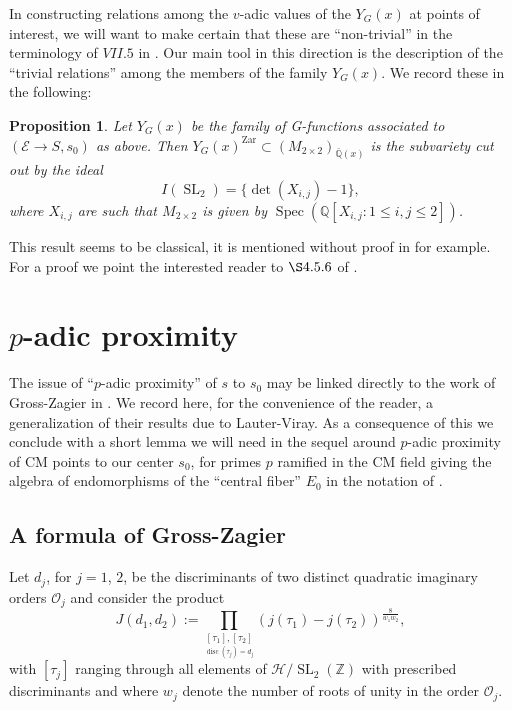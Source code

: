 \documentclass[12pt,twoside,a4paper]{article}
\theoremstyle{plain}%
\newtheorem{prop}[theorem]{Proposition}
\DeclareMathOperator{\SL}{SL}
\DeclareMathOperator{\spec}{Spec}
\DeclareMathOperator{\disc}{disc}
\DeclareMathOperator{\zar}{Zar}
\newcommand{\Z}{\mathbb{Z}}
\newcommand{\Q}{\mathbb{Q}}
\newcommand{\CE}{\mathcal{E}}
\newcommand{\CO}{\mathcal{O}}
\begin{document}
In constructing relations among the $v$-adic values of the $Y_G(x)$ at points of interest, we will want to make certain that these are ``non-trivial'' in the terminology of $VII.5$ in \cite{andre1989g}. Our main tool in this direction is the description of the ``trivial relations'' among the members of the family $Y_G(x)$. We record these in the following:

\begin{prop}\label{trivialrelations}
	Let $Y_G(x)$ be the family of G-functions associated to $(\CE\rightarrow S, s_0)$ as above. Then $Y_G(x)^{\zar}\subset (M_{2\times 2})_{\bar{\Q}(x)}$ is the subvariety cut out by the ideal \begin{equation}\label{eq:trivialideal}
		I(\SL_2)=\{\det(X_{i,j})-1 \},
	\end{equation}where $X_{i,j}$ are such that $M_{2\times 2}$ is given by $\spec({\Q}[X_{i,j}:1\leq i,j\leq 2])$.
\end{prop}
This result seems to be classical, it is mentioned without proof in \cite{beukers} for example. For a proof we point the interested reader to $\S 4.5.6$ of \cite{daworrpap}.

\section{$p$-adic proximity}\label{section:padicprox}

The issue of ``$p$-adic proximity'' of $s$ to $s_0$ may be linked directly to the work of Gross-Zagier in \cite{grosszagier}. We record here, for the convenience of the reader, a generalization of their results due to Lauter-Viray. As a consequence of this we conclude with a short lemma we will need in the sequel around $p$-adic proximity of CM points to our center $s_0$, for primes $p$ ramified in the CM field giving the algebra of endomorphisms of the ``central fiber'' $E_{0}$ in the notation of .

\subsection{A formula of Gross-Zagier}\label{section:lauterviraysummary}
Let $d_j$, for $j=1$, $2$, be the discriminants of two distinct quadratic imaginary orders $\CO_j$ and consider the product 
\begin{equation}
	J(d_1,d_2):=\underset{\underset{\disc(\tau_j)=d_j}{[\tau_1],[\tau_2]}}{\prod}(j(\tau_1)-j(\tau_2))^{\frac{8}{w_1w_2}},
\end{equation}with $[\tau_j]$ ranging through all elements of $\mathcal{H}/\SL_2(\Z)$ with prescribed discriminants and where $w_j$ denote the number of roots of unity in the order $\CO_j$.
\end{document}
